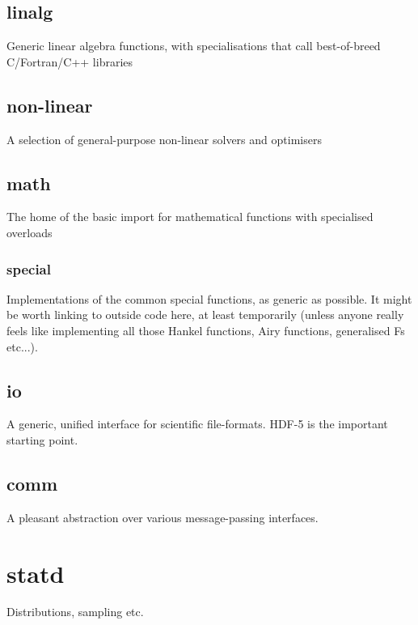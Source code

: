 \documentclass[10pt,a5paper,DIV=13]{scrartcl}
\begin{document}
\subsection{linalg}
Generic linear algebra functions, with specialisations that call best-of-breed C/Fortran/C++ libraries
\subsection{non-linear}
A selection of general-purpose non-linear solvers and optimisers
\subsection{math}
The home of the basic import for mathematical functions with specialised overloads
\subsubsection{special}
Implementations of the common special functions, as generic as possible. It might be worth linking to outside code here, at least temporarily (unless anyone really feels like implementing all those Hankel functions, Airy functions, generalised Fs etc...).
\subsection{io}
A generic, unified interface for scientific file-formats. HDF-5 is the important starting point.
\subsection{comm}
A pleasant abstraction over various message-passing interfaces.

\section{statd}
Distributions, sampling etc.
\end{document}
